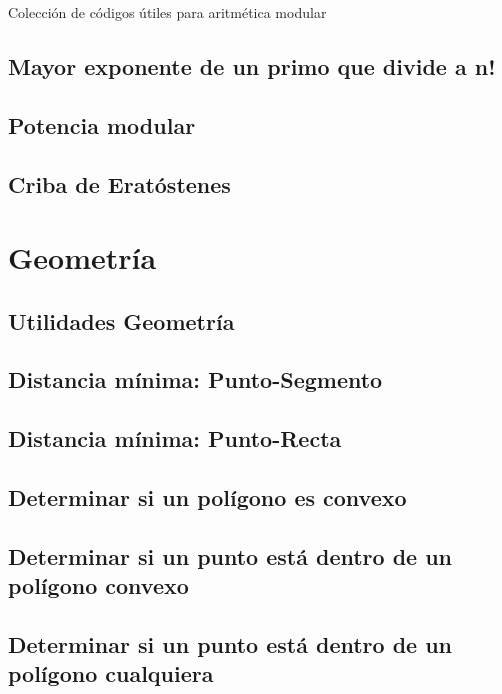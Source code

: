 \documentclass[10pt,letterpaper,twocolumn,twosided]{article}
\newcommand{\codigofuente}[1]{

\dotfill
}
\begin{document}
Colección de códigos útiles para aritmética modular\\
\codigofuente{../src/euclidean.${EXT}}

\subsection{Mayor exponente de un primo que divide a n!}
\codigofuente{../src/pow_div.${EXT}}


\subsection{Potencia modular}

\subsection{Criba de Eratóstenes}



\section{Geometría}

\subsection{Utilidades Geometría}

\subsection{Distancia mínima: Punto-Segmento}

\subsection{Distancia mínima: Punto-Recta}

\subsection{Determinar si un polígono es convexo}

\subsection{Determinar si un punto está dentro de un polígono convexo}

\subsection{Determinar si un punto está dentro de un polígono cualquiera}
\end{document}
